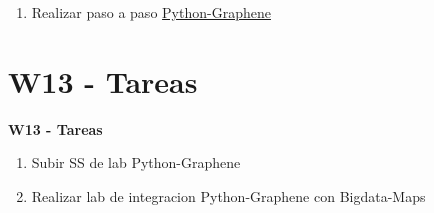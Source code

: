 \documentclass{beamer}
\begin{document}
\begin{frame}
\begin{enumerate}
\item
   Realizar paso a paso      
    \href{https://www.howtographql.com/graphql-python/0-introduction/}{Python-Graphene}
 
\end{enumerate}

	


\end{frame}


\section{W13  - Tareas }

\begin{frame}


\textbf{W13  - Tareas}


\begin{enumerate}

\item
  Subir SS de lab Python-Graphene

\item
  Realizar lab de integracion Python-Graphene con Bigdata-Maps
  	
\end{enumerate} 


\end{frame}
\end{document}

